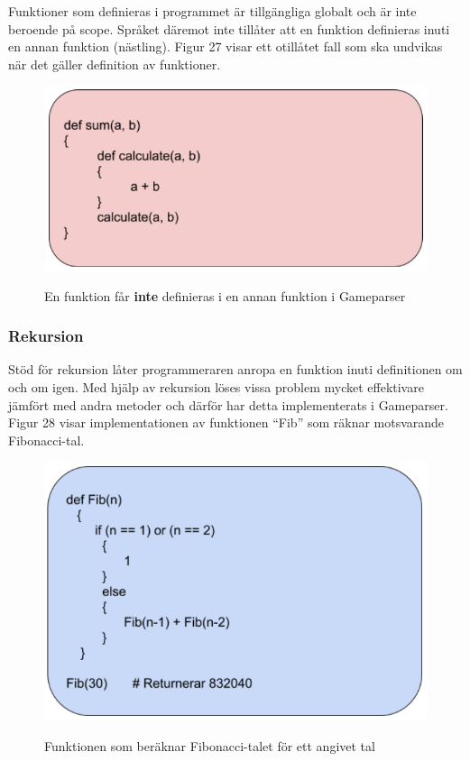 \documentclass{Dokumentmall}
\begin{document}
Funktioner som definieras i programmet är tillgängliga globalt och är inte beroende på scope.
Språket däremot inte tillåter att en funktion definieras inuti en annan funktion (nästling). Figur 27 visar ett otillåtet fall som ska undvikas när det gäller definition av funktioner. 

\begin{figure}[h!]
  \centering
  \includegraphics[scale = 0.65]{Images/Figur27.png}
  \label{}
  \caption{En funktion får \textbf{inte} definieras i en annan funktion i Gameparser}
\end{figure}

\newpage
\subsubsection{Rekursion}
Stöd för rekursion låter programmeraren anropa en funktion inuti definitionen om och om igen. Med hjälp av rekursion löses vissa problem mycket effektivare jämfört med andra metoder och därför har detta implementerats i Gameparser. Figur 28 visar implementationen av funktionen ``Fib'' som räknar motsvarande Fibonacci-tal.

\begin{figure}[h!]
  \centering
  \includegraphics[scale = 0.65]{Images/Figur28.png}
  \label{}
  \caption{Funktionen som beräknar Fibonacci-talet för ett angivet tal}
\end{figure}
\end{document}
